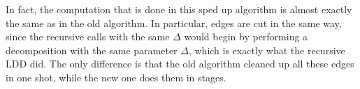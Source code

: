 \documentclass[12pt]{article}
\begin{document}
\begin{remark}
  In fact, the computation that is done in this sped up algorithm is almost
  exactly the same as in the old algorithm. In particular, edges are cut in the
  same way, since the recursive calls with the same $\Delta$ would begin by
  performing a decomposition with the same parameter $\Delta$, which is exactly
  what the recursive LDD did. The only difference is that the old algorithm
  cleaned up all these edges in one shot, while the new one does them in stages.
\end{remark}

\printbibliography
\end{document}
